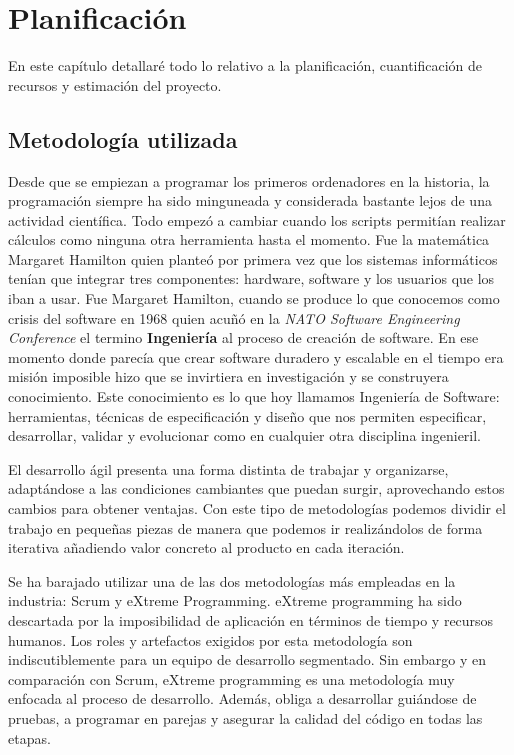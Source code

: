 \chapter{Planificación}
\label{sec:plani}
En este capítulo detallaré todo lo relativo a la planificación, cuantificación de recursos y
estimación del proyecto. 

\section{Metodología utilizada}
\label{sec:meto}
Desde que se empiezan a programar los primeros ordenadores en la historia, la programación
siempre ha sido minguneada y considerada bastante lejos de una actividad científica. Todo
empezó a cambiar cuando los scripts permitían realizar cálculos como ninguna otra
herramienta hasta el momento. Fue la matemática Margaret Hamilton quien planteó por
primera vez que los sistemas informáticos tenían que integrar tres componentes: hardware,
software y los usuarios que los iban a usar. Fue Margaret Hamilton, cuando se produce lo
que conocemos como crisis del software en 1968 quien acuñó en la \textit{NATO Software
Engineering Conference} el termino \textbf{Ingeniería} al proceso de creación de software. En ese
momento donde parecía que crear software duradero y escalable en el tiempo era misión
imposible hizo que se invirtiera en investigación y se construyera conocimiento. Este
conocimiento es lo que hoy llamamos Ingeniería de Software: herramientas, técnicas de
especificación y diseño que nos permiten especificar, desarrollar, validar y evolucionar
como en cualquier otra disciplina ingenieril.

El desarrollo ágil presenta una forma distinta de trabajar y organizarse, adaptándose
a las condiciones cambiantes que puedan surgir, aprovechando estos cambios para obtener
ventajas. Con este tipo de metodologías podemos dividir el trabajo en pequeñas piezas de
manera que podemos ir realizándolos de forma iterativa añadiendo valor concreto al
producto en cada iteración.

Se ha barajado utilizar una de las dos metodologías más empleadas en la industria: Scrum y
eXtreme Programming. eXtreme programming ha sido descartada por la imposibilidad de
aplicación en términos de tiempo y recursos humanos. Los roles y artefactos exigidos por
esta metodología son indiscutiblemente para un equipo de desarrollo segmentado. Sin
embargo y en comparación con Scrum, eXtreme programming es una metodología muy enfocada al proceso de
desarrollo. Además, obliga a desarrollar guiándose de pruebas, a programar en parejas y asegurar
la calidad del código en todas las etapas.

